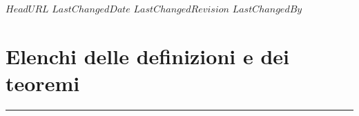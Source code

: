 \svnidlong
{$HeadURL$}
{$LastChangedDate$}
{$LastChangedRevision$}
{$LastChangedBy$}

\chapter{Elenchi delle definizioni e dei teoremi}
\nocite{*}

\listofdefinitions
\begin{center}
\rule{4cm}{0.4pt}
\end{center}
\listoftheoremas